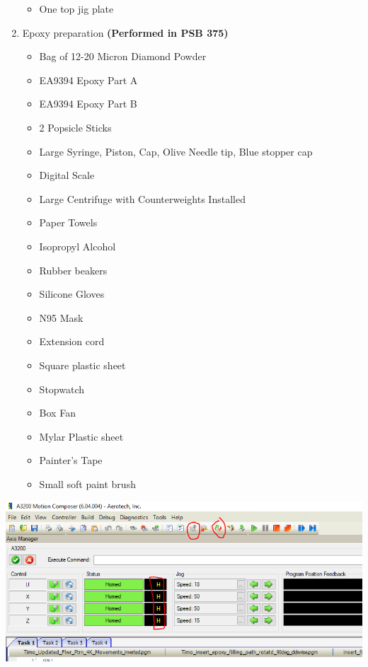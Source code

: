 \documentclass[12pt]{cornelltfpxsop}
\begin{document}
\begin{enumerate}
\begin{itemize}
        \item One top jig plate
    \end{itemize}
\item Epoxy preparation \textbf{(Performed in PSB 375)}
    \begin{itemize}
        \item Bag of 12-20 Micron Diamond Powder
        \item EA9394 Epoxy Part A
        \item EA9394 Epoxy Part B
        \item 2 Popsicle Sticks
        \item Large Syringe, Piston, Cap, Olive Needle tip, Blue stopper cap
        \item Digital Scale
        \item Large Centrifuge with Counterweights Installed
        \item Paper Towels
        \item Isopropyl Alcohol
        \item Rubber beakers
        \item Silicone Gloves
        \item N95 Mask
        \item Extension cord
        \item Square plastic sheet
        \item Stopwatch
        \item Box Fan
        \item Mylar Plastic sheet
        \item Painter's Tape
        \item Small soft paint brush
    \end{itemize}
\end{enumerate}
\includegraphics[width=1\textwidth,angle = 0]{img/MCDiagram.png}
\end{document}
